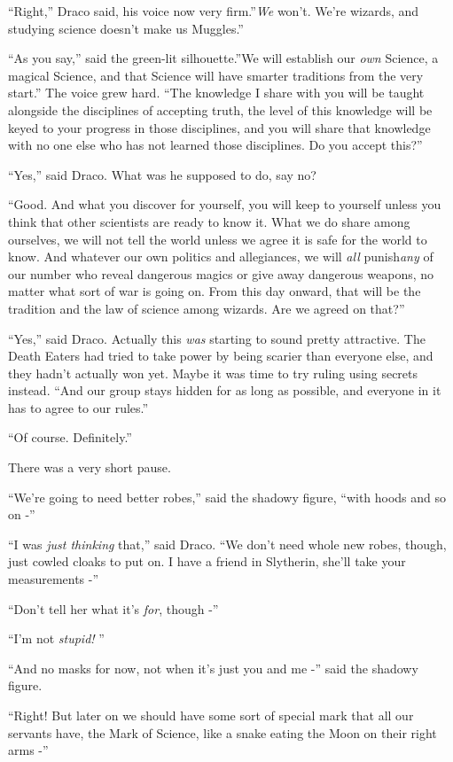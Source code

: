 ``Right,'' Draco said, his voice now very firm.''\emph{We} won't. We're
wizards, and studying science doesn't make us Muggles.''

``As you say,'' said the green-lit silhouette.''We will establish our
\emph{own} Science, a magical Science, and that Science will have
smarter traditions from the very start.'' The voice grew hard. ``The
knowledge I share with you will be taught alongside the disciplines of
accepting truth, the level of this knowledge will be keyed to your
progress in those disciplines, and you will share that knowledge with no
one else who has not learned those disciplines. Do you accept this?''

``Yes,'' said Draco. What was he supposed to do, say no?

``Good. And what you discover for yourself, you will keep to yourself
unless you think that other scientists are ready to know it. What we do
share among ourselves, we will not tell the world unless we agree it is
safe for the world to know. And whatever our own politics and
allegiances, we will \emph{all} punish\emph{any} of our number who
reveal dangerous magics or give away dangerous weapons, no matter what
sort of war is going on. From this day onward, that will be the
tradition and the law of science among wizards. Are we agreed on that?''

``Yes,'' said Draco. Actually this \emph{was} starting to sound pretty
attractive. The Death Eaters had tried to take power by being scarier
than everyone else, and they hadn't actually won yet. Maybe it was time
to try ruling using secrets instead. ``And our group stays hidden for as
long as possible, and everyone in it has to agree to our rules.''

``Of course. Definitely.''

There was a very short pause.

``We're going to need better robes,'' said the shadowy figure, ``with
hoods and so on -''

``I was \emph{just thinking} that,'' said Draco. ``We don't need whole
new robes, though, just cowled cloaks to put on. I have a friend in
Slytherin, she'll take your measurements -''

``Don't tell her what it's \emph{for}, though -''

``I'm not \emph{stupid!} ''

``And no masks for now, not when it's just you and me -'' said the
shadowy figure.

``Right! But later on we should have some sort of special mark that all
our servants have, the Mark of Science, like a snake eating the Moon on
their right arms -''

